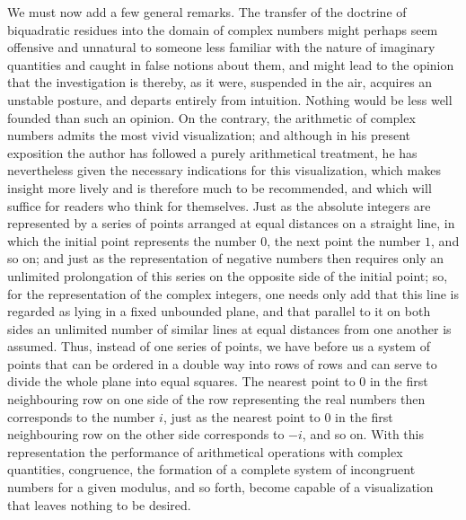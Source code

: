 \documentclass[12pt]{article}
\begin{document}
We must now add a few general remarks. The transfer of the doctrine of biquadratic residues into the domain of complex numbers might perhaps seem offensive and unnatural to someone less familiar with the nature of imaginary quantities and caught in false notions about them, and might lead to the opinion that the investigation is thereby, as it were, suspended in the air, acquires an unstable posture, and departs entirely from intuition. Nothing would be less well founded than such an opinion. On the contrary, the arithmetic of complex numbers admits the most vivid visualization; and although in his present exposition the author has followed a purely arithmetical treatment, he has nevertheless given the necessary indications for this visualization, which makes insight more lively and is therefore much to be recommended, and which will suffice for readers who think for themselves. Just as the absolute integers are represented by a series of points arranged at equal distances on a straight line, in which the initial point represents the number $0$, the next point the number $1$, and so on; and just as the representation of negative numbers then requires only an unlimited prolongation of this series on the opposite side of the initial point; so, for the representation of the complex integers, one needs only add that this line is regarded as lying in a fixed unbounded plane, and that parallel to it on both sides an unlimited number of similar lines at equal distances from one another is assumed. Thus, instead of one series of points, we have before us a system of points that can be ordered in a double way into rows of rows and can serve to divide the whole plane into equal squares. The nearest point to $0$ in the first neighbouring row on one side of the row representing the real numbers then corresponds to the number $i$, just as the nearest point to $0$ in the first neighbouring row on the other side corresponds to $-i$, and so on. With this representation the performance of arithmetical operations with complex quantities, congruence, the formation of a complete system of incongruent numbers for a given modulus, and so forth, become capable of a visualization that leaves nothing to be desired.
\end{document}

